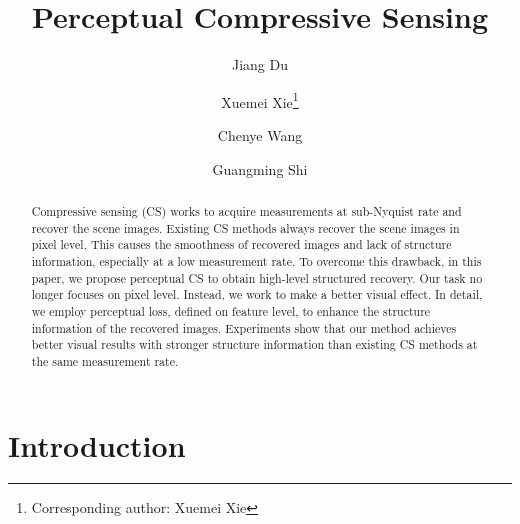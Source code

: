 \documentclass[runningheads]{llncs}
\begin{document}
%
\title{Perceptual Compressive Sensing}
%
%
\author{Jiang Du \and
Xuemei Xie\thanks{Corresponding author: Xuemei Xie} \and
Chenye Wang \and
Guangming Shi}
%
%
%
\maketitle              %
%
\begin{abstract}
Compressive sensing (CS) works to acquire measurements at sub-Nyquist rate and recover the scene images. Existing CS methods always recover the scene images in pixel level. This causes the smoothness of recovered images and lack of structure information, especially at a low measurement rate. To overcome this drawback, in this paper, we propose perceptual CS to obtain high-level structured recovery. Our task no longer focuses on pixel level. Instead, we work to make a better visual effect. In detail, we employ perceptual loss, defined on feature level, to enhance the structure information of the recovered images. Experiments show that our method achieves better visual results with stronger structure information than existing CS methods at the same measurement rate.

\end{abstract}
%
%
%
\section{Introduction}
\end{document}
